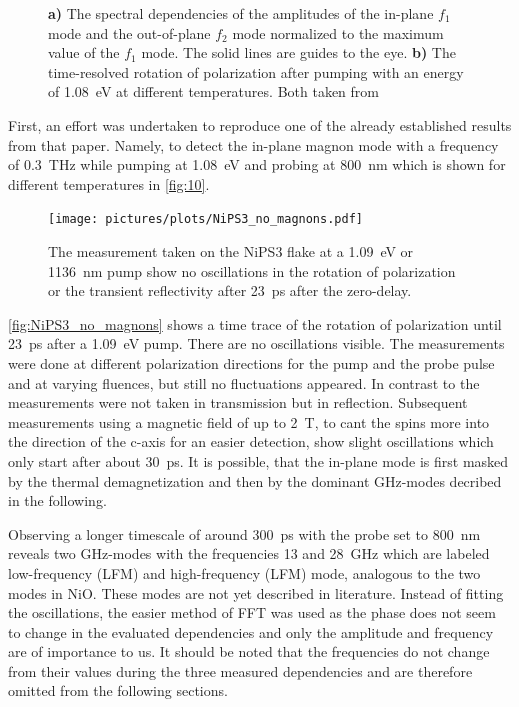 \begin{figure}[ht]
\begin{subfigure}[b]{0.28\textwidth}
        \caption{}
        \label{fig:10}
    \end{subfigure}
    \caption{\textbf{a)} The spectral dependencies of the amplitudes of the in-plane $f_1$ mode and the out-of-plane $f_2$ mode normalized to the maximum value of the $f_1$ mode. The solid lines are guides to the eye. \textbf{b)} The time-resolved rotation of polarization after pumping with an energy of \qty{1.08}{eV} at different temperatures. Both taken from }
\end{figure}
\FloatBarrier
First, an effort was undertaken to reproduce one of the already established results from that paper.
Namely, to detect the in-plane magnon mode with a frequency of \qty{0.3}{THz} while pumping at \qty{1.08}{eV} and probing at \qty{800}{nm} which is shown for different temperatures in \autoref{fig:10}.
\begin{figure}[ht]
    \centering
    \texttt{[image: pictures/plots/NiPS3\_no\_magnons.pdf]} \vspace{-0.3cm}
    \caption{The measurement taken on the NiPS3 flake at a \qty{1.09}{eV} or \qty{1136}{nm} pump show no oscillations in the rotation of polarization or the transient reflectivity after \qty{23}{ps} after the zero-delay.}
    \label{fig:NiPS3_no_magnons}
\end{figure}
\FloatBarrier
\autoref{fig:NiPS3_no_magnons} shows a time trace of the rotation of polarization until \qty{23}{ps} after a \qty{1.09}{eV} pump.
There are no oscillations visible.
The measurements were done at different polarization directions for the pump and the probe pulse and at varying fluences, but still no fluctuations appeared.
In contrast to  the measurements were not taken in transmission but in reflection.
Subsequent measurements using a magnetic field of up to \qty{2}{T}, to cant the spins more into the direction of the c-axis for an easier detection, show slight oscillations which only start after about \qty{30}{ps}.
It is possible, that the in-plane mode is first masked by the thermal demagnetization and then by the dominant GHz-modes decribed in the following.

Observing a longer timescale of around \qty{300}{ps} with the probe set to \qty{800}{nm} reveals two GHz-modes with the frequencies 13 and \qty{28}{GHz} which are labeled low-frequency (LFM) and high-frequency (LFM) mode, analogous to the two modes in NiO.
These modes are not yet described in literature.
Instead of fitting the oscillations, the easier method of FFT was used as the phase does not seem to change in the evaluated dependencies and only the amplitude and frequency are of importance to us.
It should be noted that the frequencies do not change from their values during the three measured dependencies and are therefore omitted from the following sections.

